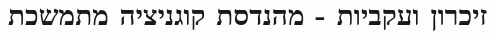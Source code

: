 \documentclass{hebrew-academic-template}
\begin{document}
\part{זיכרון ועקביות - מהנדסת קוגניציה מתמשכת}









\clearpage







\clearpage
\printenglishbibliography
\end{document}
